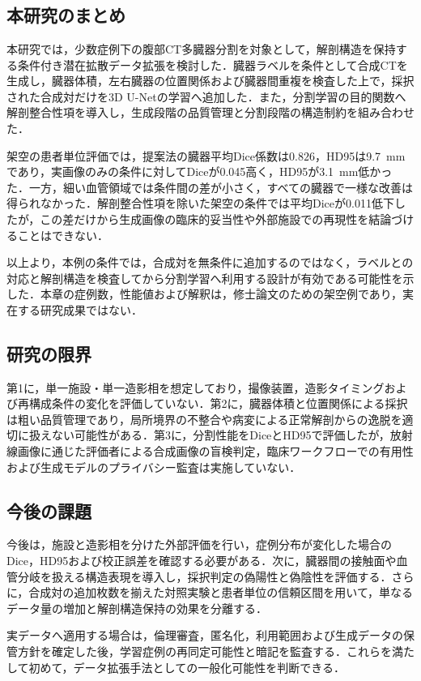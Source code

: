 \chapter{\UsamiConclusionTitle}

\begin{center}
  \UsamiFictionalExampleNotice
\end{center}

\section{本研究のまとめ}

本研究では，少数症例下の腹部CT多臓器分割を対象として，解剖構造を保持する条件付き潜在拡散データ拡張を検討した．臓器ラベルを条件として合成CTを生成し，臓器体積，左右臓器の位置関係および臓器間重複を検査した上で，採択された合成対だけを3D U-Netの学習へ追加した．また，分割学習の目的関数へ解剖整合性項を導入し，生成段階の品質管理と分割段階の構造制約を組み合わせた．

架空の患者単位評価では，提案法の臓器平均Dice係数は$0.826$，HD95は\SI{9.7}{mm}であり，実画像のみの条件に対してDiceが0.045高く，HD95が\SI{3.1}{mm}低かった．一方，細い血管領域では条件間の差が小さく，すべての臓器で一様な改善は得られなかった．解剖整合性項を除いた架空の条件では平均Diceが0.011低下したが，この差だけから生成画像の臨床的妥当性や外部施設での再現性を結論づけることはできない．

以上より，本例の条件では，合成対を無条件に追加するのではなく，ラベルとの対応と解剖構造を検査してから分割学習へ利用する設計が有効である可能性を示した．本章の症例数，性能値および解釈は，修士論文のための架空例であり，実在する研究成果ではない．

\section{研究の限界}

第1に，単一施設・単一造影相を想定しており，撮像装置，造影タイミングおよび再構成条件の変化を評価していない．第2に，臓器体積と位置関係による採択は粗い品質管理であり，局所境界の不整合や病変による正常解剖からの逸脱を適切に扱えない可能性がある．第3に，分割性能をDiceとHD95で評価したが，放射線画像に通じた評価者による合成画像の盲検判定，臨床ワークフローでの有用性および生成モデルのプライバシー監査は実施していない．

\section{今後の課題}

今後は，施設と造影相を分けた外部評価を行い，症例分布が変化した場合のDice，HD95および校正誤差を確認する必要がある．次に，臓器間の接触面や血管分岐を扱える構造表現を導入し，採択判定の偽陽性と偽陰性を評価する．さらに，合成対の追加枚数を揃えた対照実験と患者単位の信頼区間を用いて，単なるデータ量の増加と解剖構造保持の効果を分離する．

実データへ適用する場合は，倫理審査，匿名化，利用範囲および生成データの保管方針を確定した後，学習症例の再同定可能性と暗記を監査する．これらを満たして初めて，データ拡張手法としての一般化可能性を判断できる．
